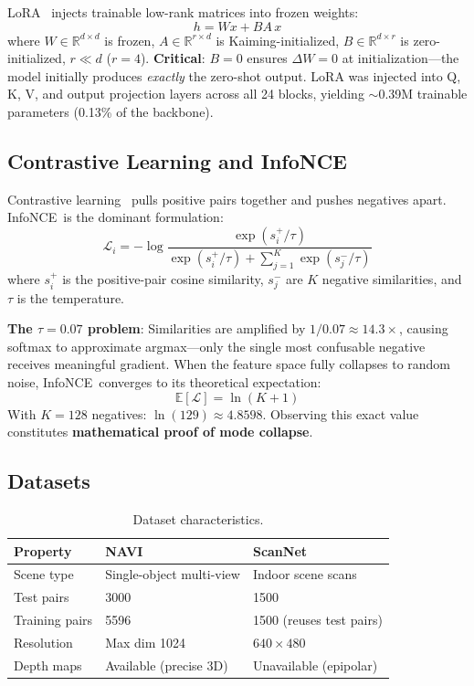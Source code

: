 \documentclass[11pt,a4paper]{article}
\newcommand{\infonce}{InfoNCE\ }
\begin{document}
LoRA~\cite{lora} injects trainable low-rank matrices into frozen weights:
\begin{equation}
h = Wx + BA\,x
\end{equation}
where $W \in \mathbb{R}^{d \times d}$ is frozen, $A \in \mathbb{R}^{r \times d}$ is Kaiming-initialized, $B \in \mathbb{R}^{d \times r}$ is zero-initialized, $r \ll d$ ($r=4$). \textbf{Critical}: $B=0$ ensures $\Delta W = 0$ at initialization---the model initially produces \emph{exactly} the zero-shot output. LoRA was injected into Q, K, V, and output projection layers across all 24 blocks, yielding $\sim$0.39M trainable parameters (0.13\% of the backbone).

\subsection{Contrastive Learning and InfoNCE}

Contrastive learning~\cite{cpc,simclr} pulls positive pairs together and pushes negatives apart. \infonce is the dominant formulation:
\begin{equation}
\mathcal{L}_i = -\log\frac{\exp(s_i^+ / \tau)}{\exp(s_i^+ / \tau) + \sum_{j=1}^{K} \exp(s_j^- / \tau)}
\end{equation}
where $s_i^+$ is the positive-pair cosine similarity, $s_j^-$ are $K$ negative similarities, and $\tau$ is the temperature.

\textbf{The $\tau = 0.07$ problem}: Similarities are amplified by $1/0.07 \approx 14.3\times$, causing softmax to approximate argmax---only the single most confusable negative receives meaningful gradient. When the feature space fully collapses to random noise, \infonce converges to its theoretical expectation:
\begin{equation}
\mathbb{E}[\mathcal{L}] = \ln(K+1)
\end{equation}
With $K = 128$ negatives: $\ln(129) \approx 4.8598$. Observing this exact value constitutes \textbf{mathematical proof of mode collapse}.

\subsection{Datasets}

\begin{table}[t]
\centering\small
\caption{Dataset characteristics.}
\label{tab:datasets}
\begin{tabular}{@{}lll@{}}
\toprule
\textbf{Property} & \textbf{NAVI~\cite{navi}} & \textbf{ScanNet~\cite{scannet}} \\
\midrule
Scene type      & Single-object multi-view & Indoor scene scans \\
Test pairs      & 3000 & 1500 \\
Training pairs  & 5596 & 1500 (reuses test pairs) \\
Resolution      & Max dim 1024 & $640\!\times\!480$ \\
Depth maps      & Available (precise 3D) & Unavailable (epipolar) \\
\bottomrule
\end{tabular}
\end{table}
\end{document}
